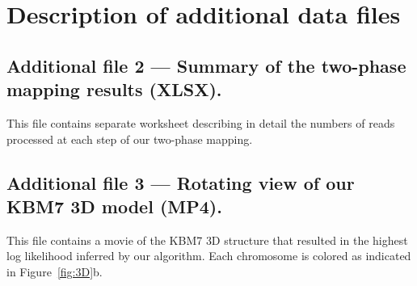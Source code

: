 \section*{Description of additional data files}
\vspace{20pt}

  {
  \subsection*{Additional file 2 --- Summary of the two-phase mapping results (XLSX).}
  This file contains separate worksheet describing in detail the numbers of reads
  processed at each step of our two-phase mapping.
  }
  \subsection*{Additional file 3 --- Rotating view of our KBM7 3D model (MP4).}
  This file contains a movie of the KBM7 3D structure that resulted in the highest log
  likelihood inferred by our algorithm. Each chromosome is colored as indicated in
  Figure~\ref{fig:3D}b.



